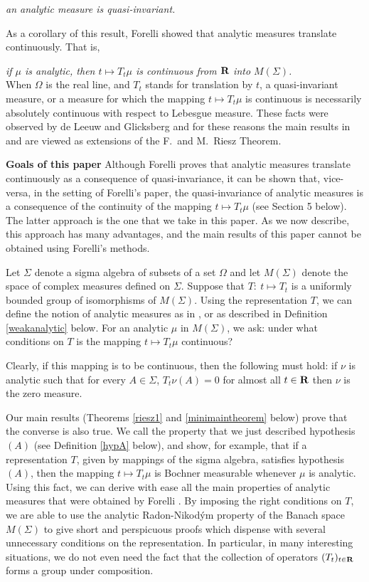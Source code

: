 {\em  an analytic measure is quasi-invariant.}

As a corollary of this result, 
Forelli \cite[Theorem 4]{forelli} showed that
analytic measures translate continuously.  That is,


{\em  if $\mu$ is analytic, then $t\mapsto T_t\mu$
is continuous from $\R$ into $M(\Sigma)$. }\\

When $\Omega$ is the real line, and $T_t$
stands for translation by $t$, a quasi-invariant measure, or a 
measure for which the mapping
$t\mapsto T_t\mu$ is continuous is necessarily
absolutely continuous with respect to Lebesgue measure.
These facts were observed
by de Leeuw and Glicksberg \cite{dg} and for these reasons
the main results in \cite{dg} and \cite{forelli}
are viewed as extensions of the F.\ and M.\ Riesz Theorem.


\bigskip
\noindent
{\bf Goals of this paper}  
Although Forelli proves that analytic measures 
translate continuously as a consequence of quasi-invariance,
it can be shown that, vice-versa, in the setting of 
Forelli's paper, the quasi-invariance of analytic measures is
a consequence of the continuity of the mapping
$t\mapsto T_t\mu$ (see Section 5 below).
The latter approach is the one that we take in this paper.
As we now describe, this approach
has many advantages, and the main 
results of this paper cannot
be obtained using Forelli's methods.


Let $\Sigma$ denote a 
sigma algebra of subsets of a set $\Omega$ 
and let $M(\Sigma)$
denote the space of complex measures defined on
$\Sigma$.  Suppose that $T:  \ t\mapsto T_t$
is a uniformly bounded group of
isomorphisms of $M(\Sigma)$.  
Using the representation $T$, we can define
the notion of analytic measures as in 
\cite{forelli}, or as described in Definition
\ref{weakanalytic} below.  For an analytic 
$\mu$ in $M(\Sigma)$, we ask:  
under what conditions
on $T$ is the mapping
$t\mapsto T_t\mu$ continuous?
  
Clearly, if this mapping is to be 
continuous, then the
following must hold:
if $\nu$ is analytic such that
for every $A\in \Sigma$,  
$T_t\nu(A)=0$ for almost all $t\in \R$ then $\nu$ is the zero measure.

Our main results (Theorems \ref{riesz1} 
and \ref{minimaintheorem} below)
prove that the converse is also true.
We call the property that we just 
described hypothesis $(A)$ (see 
Definition \ref{hypA}
below), and show, for example, that if 
a representation $T$, given by mappings of the
sigma algebra, satisfies 
hypothesis $(A)$, then
the mapping $t\mapsto T_t\mu$
is Bochner measurable whenever $\mu$ is analytic.   
Using this fact, we can derive with
ease all the main properties of
analytic measures that were obtained by Forelli \cite{forelli}.  
By imposing the right conditions on
$T$, we are able to use the analytic Radon-Nikod\'ym property
of the Banach space $M(\Sigma)$ to give 
 short and perspicuous proofs which dispense
 with several unnecessary conditions on the representation.  
 In particular, in many interesting situations,
 we do not even need the fact that the collection
 of operators $(T_t)_{t\in \R}$ forms a group
 under composition.  
 

